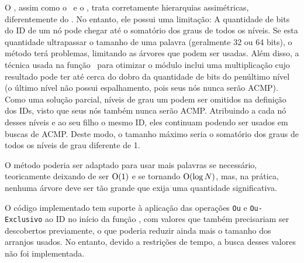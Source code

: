 O \Novo, assim como o \Hwloc\ e o \Matriz, trata corretamente hierarquias assimétricas, diferentemente do \Simples.
No entanto, ele possui uma limitação: %
A quantidade de bits do ID de um nó pode chegar até o somatório dos graus de todos os níveis.
Se esta quantidade ultrapassar o tamanho de uma palavra (geralmente 32 ou 64 bits), o método terá problemas, limitando as árvores que podem ser usadas.
Além disso, a técnica usada na função \Espalha\ para otimizar o módulo inclui uma multiplicação cujo resultado pode ter até cerca do dobro da quantidade de bits do penúltimo nível (o último nível não possui espalhamento, pois seus nós nunca serão ACMP).
Como uma solução parcial, níveis de grau um podem ser omitidos na definição dos IDs, visto que seus nós também nunca serão ACMP.
Atribuindo a cada nó desses níveis e ao seu filho o mesmo ID, eles continuam podendo ser usados em buscas de ACMP.
Deste modo, o tamanho máximo seria o somatório dos graus de todos os níveis de grau diferente de 1.

O método poderia ser adaptado para usar mais palavras se necessário, teoricamente deixando de ser $\operatorname{O}(1)$ e se tornando $\operatorname{O}(\log N)$, mas, na prática, nenhuma árvore deve ser tão grande que exija uma quantidade significativa.

O código implementado tem suporte à aplicação das operações \texttt{Ou} e \texttt{Ou-Exclusivo} ao ID no início da função \Espalha, com valores que também precisariam ser descobertos previamente, o que poderia reduzir ainda mais o tamanho dos arranjos usados. No entanto, devido a restrições de tempo, a busca desses valores não foi implementada.





